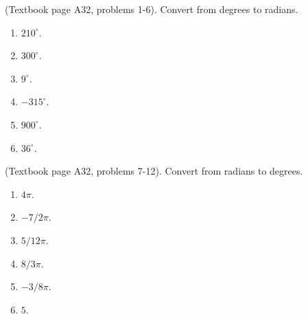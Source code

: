 \begin{problem} (Textbook page A32, problems 1-6). 
Convert from degrees to radians.
\begin{multicols}{3}
\begin{enumerate}
\item $210^\circ$.
\item $300^\circ$.
\item $9^\circ$.
\item $-315^\circ$.
\item $900^\circ$.
\item $36^\circ$.
\end{enumerate}
\end{multicols}
\end{problem}
\begin{problem} (Textbook page A32, problems 7-12). 
Convert from radians to degrees.
\begin{multicols}{3}
\begin{enumerate}
\item $4\pi$.
\item $-7/2\pi$.
\item $5/12\pi$.
\item $8/3\pi$.
\item $-3/8\pi$.
\item $5$.
\end{enumerate}
\end{multicols}
\end{problem}